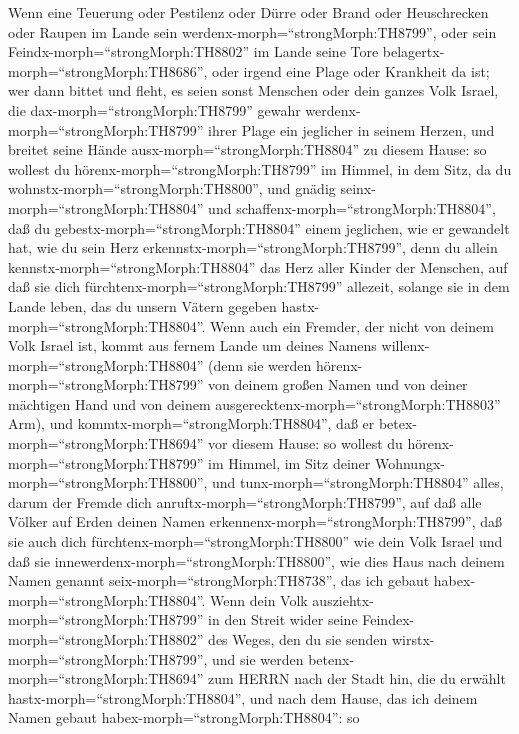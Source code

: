 Wenn eine Teuerung oder Pestilenz oder Dürre oder Brand oder
Heuschrecken oder Raupen im Lande sein
werdenx-morph=``strongMorph:TH8799'', oder sein
Feindx-morph=``strongMorph:TH8802'' im Lande seine Tore
belagertx-morph=``strongMorph:TH8686'', oder irgend eine Plage oder
Krankheit da ist;  wer dann bittet und fleht, es seien
sonst Menschen oder dein ganzes Volk Israel, die
dax-morph=``strongMorph:TH8799'' gewahr
werdenx-morph=``strongMorph:TH8799'' ihrer Plage ein jeglicher in seinem
Herzen, und breitet seine Hände ausx-morph=``strongMorph:TH8804'' zu
diesem Hause:  so wollest du
hörenx-morph=``strongMorph:TH8799'' im Himmel, in dem Sitz, da du
wohnstx-morph=``strongMorph:TH8800'', und gnädig
seinx-morph=``strongMorph:TH8804'' und
schaffenx-morph=``strongMorph:TH8804'', daß du
gebestx-morph=``strongMorph:TH8804'' einem jeglichen, wie er gewandelt
hat, wie du sein Herz erkennstx-morph=``strongMorph:TH8799'', denn du
allein kennstx-morph=``strongMorph:TH8804'' das Herz aller Kinder der
Menschen,  auf daß sie dich
fürchtenx-morph=``strongMorph:TH8799'' allezeit, solange sie in dem
Lande leben, das du unsern Vätern gegeben
hastx-morph=``strongMorph:TH8804''.  Wenn auch ein Fremder,
der nicht von deinem Volk Israel ist, kommt aus fernem Lande um deines
Namens willenx-morph=``strongMorph:TH8804''  (denn sie
werden hörenx-morph=``strongMorph:TH8799'' von deinem großen Namen und
von deiner mächtigen Hand und von deinem
ausgerecktenx-morph=``strongMorph:TH8803'' Arm), und
kommtx-morph=``strongMorph:TH8804'', daß er
betex-morph=``strongMorph:TH8694'' vor diesem Hause:  so
wollest du hörenx-morph=``strongMorph:TH8799'' im Himmel, im Sitz deiner
Wohnungx-morph=``strongMorph:TH8800'', und
tunx-morph=``strongMorph:TH8804'' alles, darum der Fremde dich
anruftx-morph=``strongMorph:TH8799'', auf daß alle Völker auf Erden
deinen Namen erkennenx-morph=``strongMorph:TH8799'', daß sie auch dich
fürchtenx-morph=``strongMorph:TH8800'' wie dein Volk Israel und daß sie
innewerdenx-morph=``strongMorph:TH8800'', wie dies Haus nach deinem
Namen genannt seix-morph=``strongMorph:TH8738'', das ich gebaut
habex-morph=``strongMorph:TH8804''.  Wenn dein Volk
ausziehtx-morph=``strongMorph:TH8799'' in den Streit wider seine
Feindex-morph=``strongMorph:TH8802'' des Weges, den du sie senden
wirstx-morph=``strongMorph:TH8799'', und sie werden
betenx-morph=``strongMorph:TH8694'' zum HERRN nach der Stadt hin, die du
erwählt hastx-morph=``strongMorph:TH8804'', und nach dem Hause, das ich
deinem Namen gebaut habex-morph=``strongMorph:TH8804'':  so
